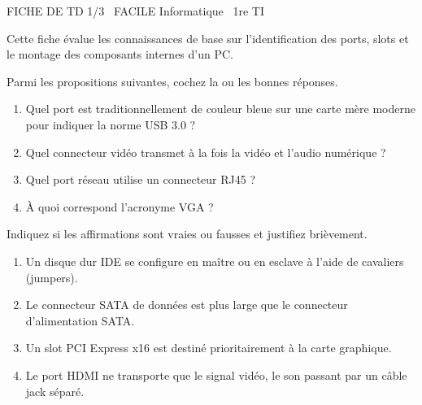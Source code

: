\documentclass[11pt]{article}
\begin{document}
\begin{tcolorbox}[enhanced,colback=popink,colframe=popink,arc=10pt,boxrule=0pt,left=12pt,right=12pt,top=9pt,bottom=9pt]
{\color{white}\popxbold\small FICHE DE TD 1/3 \textbullet\ FACILE \hfill Informatique \textbullet\ 1re TI\par}
\end{tcolorbox}
\vspace{4pt}
Cette fiche évalue les connaissances de base sur l'identification des ports, slots et le montage des composants internes d'un PC.

\begin{exercice}
Parmi les propositions suivantes, cochez la ou les bonnes réponses.
\begin{enumerate}
    \item Quel port est traditionnellement de couleur bleue sur une carte mère moderne pour indiquer la norme USB 3.0 ?
    \item Quel connecteur vidéo transmet à la fois la vidéo et l'audio numérique ?
    \item Quel port réseau utilise un connecteur RJ45 ?
    \item À quoi correspond l'acronyme VGA ?
\end{enumerate}
\end{exercice}

\begin{exercice}
Indiquez si les affirmations sont vraies ou fausses et justifiez brièvement.
\begin{enumerate}
    \item Un disque dur IDE se configure en maître ou en esclave à l'aide de cavaliers (jumpers).
    \item Le connecteur SATA de données est plus large que le connecteur d'alimentation SATA.
    \item Un slot PCI Express x16 est destiné prioritairement à la carte graphique.
    \item Le port HDMI ne transporte que le signal vidéo, le son passant par un câble jack séparé.
\end{enumerate}
\end{exercice}
\end{document}
